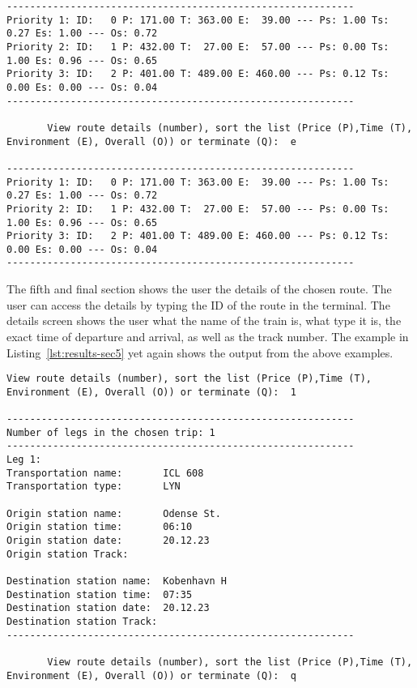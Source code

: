\begin{lstlisting}[label={lst:results-sec4}, caption={Routes table output.}, captionpos=b, language={}]
------------------------------------------------------------
Priority 1: ID:   0 P: 171.00 T: 363.00 E:  39.00 --- Ps: 1.00 Ts: 0.27 Es: 1.00 --- Os: 0.72
Priority 2: ID:   1 P: 432.00 T:  27.00 E:  57.00 --- Ps: 0.00 Ts: 1.00 Es: 0.96 --- Os: 0.65
Priority 3: ID:   2 P: 401.00 T: 489.00 E: 460.00 --- Ps: 0.12 Ts: 0.00 Es: 0.00 --- Os: 0.04
------------------------------------------------------------

       View route details (number), sort the list (Price (P),Time (T), Environment (E), Overall (O)) or terminate (Q):  e

------------------------------------------------------------
Priority 1: ID:   0 P: 171.00 T: 363.00 E:  39.00 --- Ps: 1.00 Ts: 0.27 Es: 1.00 --- Os: 0.72
Priority 2: ID:   1 P: 432.00 T:  27.00 E:  57.00 --- Ps: 0.00 Ts: 1.00 Es: 0.96 --- Os: 0.65
Priority 3: ID:   2 P: 401.00 T: 489.00 E: 460.00 --- Ps: 0.12 Ts: 0.00 Es: 0.00 --- Os: 0.04
------------------------------------------------------------
\end{lstlisting}

The fifth and final section shows the user the details of the chosen route.
The user can access the details by typing the ID of the route in the terminal.
The details screen shows the user what the name of the train is, what type it is, the exact time of departure and
arrival, as well as the track number.
The example in Listing~\ref{lst:results-sec5} yet again shows the output from the above examples.

\begin{lstlisting}[label={lst:results-sec5}, caption={Route details output.}, captionpos=b, language={}]
       View route details (number), sort the list (Price (P),Time (T), Environment (E), Overall (O)) or terminate (Q):  1

------------------------------------------------------------
Number of legs in the chosen trip: 1
------------------------------------------------------------
Leg 1:
Transportation name:       ICL 608
Transportation type:       LYN

Origin station name:       Odense St.
Origin station time:       06:10
Origin station date:       20.12.23
Origin station Track:

Destination station name:  Kobenhavn H
Destination station time:  07:35
Destination station date:  20.12.23
Destination station Track:
------------------------------------------------------------

       View route details (number), sort the list (Price (P),Time (T), Environment (E), Overall (O)) or terminate (Q):  q
\end{lstlisting}

